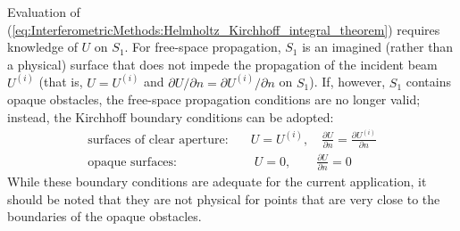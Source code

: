 Evaluation of
(\ref{eq:InterferometricMethods:Helmholtz_Kirchhoff_integral_theorem})
requires knowledge of $U$ on $S_1$.
For free-space propagation,
$S_1$ is an imagined (rather than a physical) surface
that does not impede the propagation of the incident beam $U^{(i)}$
(that is, $U = U^{(i)}$ and
$\partial U / \partial n = \partial U^{(i)} / \partial n$ on $S_1$).
If, however, $S_1$ contains opaque obstacles,
the free-space propagation conditions are no longer valid;
instead, the Kirchhoff boundary conditions can be adopted:
\begin{align}
  \text{surfaces of clear aperture:}&
  \quad
  U = U^{(i)},
  \quad
  \frac{\partial U}{\partial n} = \frac{\partial U^{(i)}}{\partial n}
  \\
  \text{opaque surfaces:}&
  \quad \;
  U = 0,
  \qquad
  \frac{\partial U}{\partial n} = 0
\end{align}
While these boundary conditions are adequate for the current application,
it should be noted that they are not physical
for points that are very close to the boundaries of the opaque obstacles.


